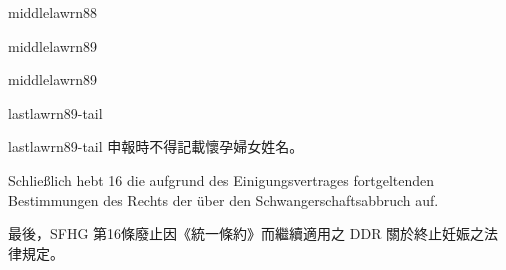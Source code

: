 \documentclass[12pt]{article}
\begin{document}
\begin{transboxpara}
\begin{lawboxpart}{middle}{lawrn88}
\end{lawboxpart}
\end{transboxpara}
\begin{sourceboxpara}
\begin{lawboxpart}{middle}{lawrn89}
\end{lawboxpart}
\end{sourceboxpara}
\begin{transboxpara}
\begin{lawboxpart}{middle}{lawrn89}
\end{lawboxpart}
\end{transboxpara}
\begin{sourceboxpara}
\begin{lawboxpart}{last}{lawrn89-tail}
\end{lawboxpart}
\end{sourceboxpara}
\begin{transboxpara}
\begin{lawboxpart}{last}{lawrn89-tail}
申報時不得記載懷孕婦女姓名。
\end{lawboxpart}
\end{transboxpara}

\begin{sourcepara}[title={原文理由 A.II.3.c 續}]
Schließlich hebt \abbrArt{} 16 \abbrSFHG{} die aufgrund des Einigungsvertrages fortgeltenden Bestimmungen des Rechts der \abbrDDR{} über den Schwangerschaftsabbruch auf.
\end{sourcepara}
\begin{transpara}
最後，SFHG 第16條廢止因《統一條約》而繼續適用之 DDR 關於終止妊娠之法律規定。
\end{transpara}

\end{document}
